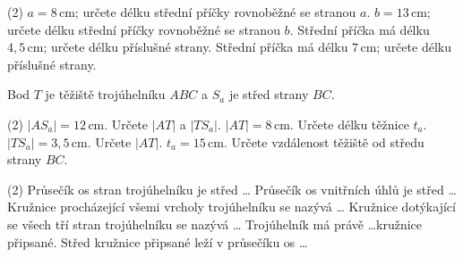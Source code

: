 \documentclass[12pt,a4paper]{article}
\begin{document}

\begin{exercise}

    \begin{tasks}(2)
        \task $a=8\,\mathrm{cm}$; určete délku střední příčky rovnoběžné se stranou $a$.
        \task $b=13\,\mathrm{cm}$; určete délku střední příčky rovnoběžné se stranou $b$.
        \task Střední příčka má délku $4{,}5\,\mathrm{cm}$; určete délku příslušné strany.
        \task Střední příčka má délku $7\,\mathrm{cm}$; určete délku příslušné strany.
    \end{tasks}

\end{exercise}



\begin{exercise}

    Bod $T$ je těžiště trojúhelníku $ABC$ a $S_a$ je střed strany $BC$.

    \begin{tasks}(2)
        \task $|AS_a|=12\,\mathrm{cm}$. Určete $|AT|$ a $|TS_a|$.
        \task $|AT|=8\,\mathrm{cm}$. Určete délku těžnice $t_a$.
        \task $|TS_a|=3{,}5\,\mathrm{cm}$. Určete $|AT|$.
        \task $t_a=15\,\mathrm{cm}$. Určete vzdálenost těžiště od středu strany $BC$.
    \end{tasks}

\end{exercise}



\begin{exercise}

    \begin{tasks}(2)
        \task Průsečík os stran trojúhelníku je střed \dots
        \task Průsečík os vnitřních úhlů je střed \dots
        \task Kružnice procházející všemi vrcholy trojúhelníku se nazývá \dots
        \task Kružnice dotýkající se všech tří stran trojúhelníku se nazývá \dots
        \task Trojúhelník má právě \dots kružnice připsané.
        \task Střed kružnice připsané leží v průsečíku os \dots
    \end{tasks}

\end{exercise}
\end{document}
